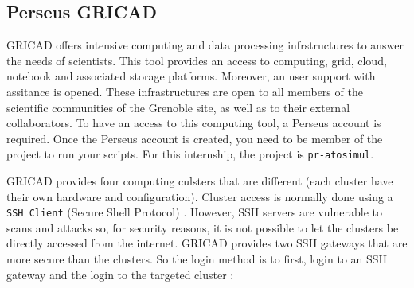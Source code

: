     \subsection{Perseus GRICAD}

        GRICAD offers intensive computing and data processing infrstructures to answer the needs of scientists. This tool provides an access to computing, grid, cloud, notebook and associated storage platforms. Moreover, an user support with assitance is opened. These infrastructures are open to all members of the scientific communities of the Grenoble site, as well as to their external collaborators. To have an access to this computing tool, a Perseus account is required. Once the Perseus account is created, you need to be member of the project to run your scripts. For this internship, the project is \verb|pr-atosimul|. \medskip

        GRICAD provides four computing culsters that are different (each cluster have their own hardware and configuration). Cluster access is normally done using a \verb|SSH Client| (Secure Shell Protocol) \cite{1}. However, \gls{SSH} servers are vulnerable to scans and attacks so, for security reasons, it is not possible to let the clusters be directly accessed from the internet. GRICAD provides two \gls{SSH} gateways that are more secure than the clusters. So the login method is to first, login to an \gls{SSH} gateway and the login to the targeted cluster : 

